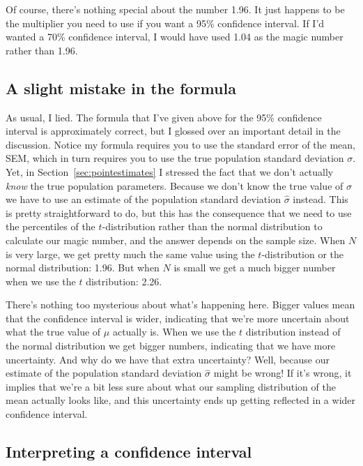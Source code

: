 Of course, there's nothing special about the number 1.96. It just happens to be the multiplier you need to use if you want a 95\% confidence interval. If I'd wanted a 70\% confidence interval, I would have used 1.04 as the magic number rather than 1.96.

\subsection{A slight mistake in the formula}

As usual, I lied. The formula that I've given above for the 95\% confidence interval is approximately correct, but I glossed over an important detail in the discussion. Notice my formula requires you to use the standard error of the mean, SEM, which in turn requires you to use the true population standard deviation $\sigma$. Yet, in Section~\ref{sec:pointestimates} I stressed the fact that we don't actually {\it know} the true population parameters. Because we don't know the true value of $\sigma$ we have to use an estimate of the population standard deviation $\hat{\sigma}$ instead. This is pretty straightforward to do, but this has the consequence that we need to use the percentiles of the $t$-distribution rather than the normal distribution to calculate our magic number, and the answer depends on the sample size. When $N$ is very large, we get pretty much the same value using the $t$-distribution or the normal distribution: 1.96. But when $N$ is small we get a much bigger number when we use the $t$ distribution: 2.26.

There's nothing too mysterious about what's happening here. Bigger values mean that the confidence interval is wider, indicating that we're more uncertain about what the true value of $\mu$ actually is. When we use the $t$ distribution instead of the normal distribution we get bigger numbers, indicating that we have more uncertainty. And why do we have that extra uncertainty? Well, because our estimate of the population standard deviation $\hat\sigma$ might be wrong! If it's wrong, it implies that we're a bit less sure about what our sampling distribution of the mean actually looks like, and this uncertainty ends up getting reflected in a wider confidence interval.  

\subsection{Interpreting a confidence interval}


